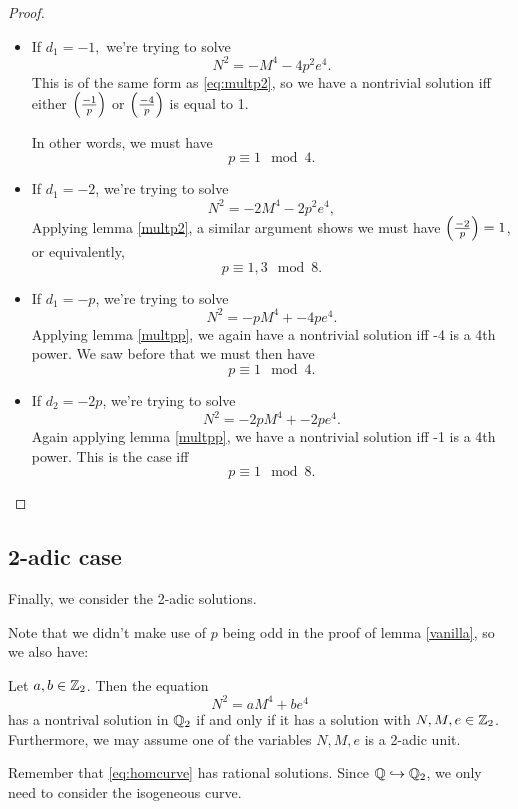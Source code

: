 \documentclass[12pt, a4paper]{report}
\begin{document}
\begin{proof}
\begin{itemize}
  \item If $d_1 = -1,$ we're trying to solve
    \[N^2 = -M^4 - 4p^2e^4.\]
    This is of the same form as \autoref{eq:multp2}, so we have a nontrivial
    solution iff either $\left(\frac{-1}{p}\right)$ or $\left(\frac{-4}{p}\right)$ is
    equal to 1.

    In other words, we must have
    \[p \equiv 1 \mod{4}.\]


  \item If $d_1 = -2$, we're trying to solve
    \[N^2 = -2M^4 - 2p^2e^4,\]
    Applying lemma \ref{multp2}, a similar argument shows
    we must have $\left(\frac{-2}{p}\right)=1$,
    or equivalently,
    \[p \equiv 1,3 \mod{8}.\]

  \item If $d_1 = -p$, we're trying to solve
    \[N^2 = -pM^4 + -4pe^4.\]
    Applying lemma \ref{multpp}, we again have a nontrivial solution
    iff -4 is a 4th power. We saw before that we must then have
    \[p \equiv 1 \mod{4}.\]

  \item If $d_2 = -2p$, we're trying to solve
    \[N^2 = -2pM^4 + -2pe^4.\]
    Again applying lemma \ref{multpp}, we have a nontrivial solution
    iff -1 is a 4th power. This is the case iff
    \[p \equiv 1 \mod{8}.\]
    
  \end{itemize} \qedhere
\end{proof}

\subsection{2-adic case}

Finally, we consider the 2-adic solutions.

Note that we didn't make use of $p$ being odd in the proof of lemma
\ref{vanilla}, so we also have:

\begin{lemma}
  Let $a, b \in {\mathbb Z}_2$. Then the equation
  \[N^2 = aM^4 + be^4\]
  has a nontrival solution in ${\mathbb Q}_2$ if and only if it has a solution
  with $N,M,e \in {\mathbb Z}_2$. Furthermore, we may assume one of the variables
  $N,M,e$ is a 2-adic unit.
\end{lemma}

Remember that \autoref{eq:homcurve} has
rational solutions. Since ${\mathbb Q} \hookrightarrow {\mathbb Q}_2$,
we only need to consider the isogeneous curve.
\end{document}
